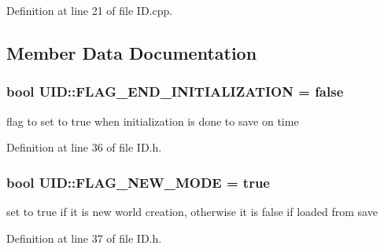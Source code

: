 Definition at line 21 of file I\+D.\+cpp.



\subsection{Member Data Documentation}
\hypertarget{classsolar__core_1_1_u_i_d_a23943efd42a1812828f7be421797236f}{}
\subsubsection[{F\+L\+A\+G\+\_\+\+E\+N\+D\+\_\+\+I\+N\+I\+T\+I\+A\+L\+I\+Z\+A\+T\+I\+O\+N}]{\setlength{\rightskip}{0pt plus 5cm}bool U\+I\+D\+::\+F\+L\+A\+G\+\_\+\+E\+N\+D\+\_\+\+I\+N\+I\+T\+I\+A\+L\+I\+Z\+A\+T\+I\+O\+N = false\hspace{0.3cm}{\ttfamily [static]}}\label{classsolar__core_1_1_u_i_d_a23943efd42a1812828f7be421797236f}
flag to set to true when initialization is done to save on time 

Definition at line 36 of file I\+D.\+h.

\hypertarget{classsolar__core_1_1_u_i_d_ab96cdedef8e2c2c7fb70505b930415a8}{}
\subsubsection[{F\+L\+A\+G\+\_\+\+N\+E\+W\+\_\+\+M\+O\+D\+E}]{\setlength{\rightskip}{0pt plus 5cm}bool U\+I\+D\+::\+F\+L\+A\+G\+\_\+\+N\+E\+W\+\_\+\+M\+O\+D\+E = true\hspace{0.3cm}{\ttfamily [static]}}\label{classsolar__core_1_1_u_i_d_ab96cdedef8e2c2c7fb70505b930415a8}
set to true if it is new world creation, otherwise it is false if loaded from save 

Definition at line 37 of file I\+D.\+h.

